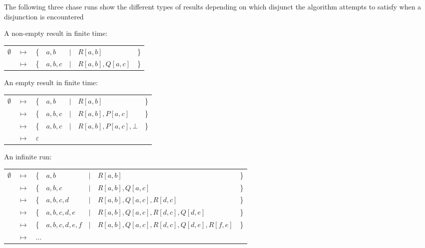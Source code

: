		The following three chase runs show the different types of results
		depending on which disjunct the algorithm attempts to satisfy when a
		disjunction is encountered

		A non-empty result in finite time:

		\begin{tabular}{lllllll}
			$\emptyset$ & $\mapsto$ & \{ & $a,b$   & $|$ & $R[a,b]$         & \} \\
			{}          & $\mapsto$ & \{ & $a,b,c$ & $|$ & $R[a,b], Q[a,c]$ & \} \\
		\end{tabular}

		An empty result in finite time:

		\begin{tabular}{lllllll}
			$\emptyset$ & $\mapsto$ & \{ & $a,b$   & $|$ & $R[a,b]$               & \} \\
			{}          & $\mapsto$ & \{ & $a,b,c$ & $|$ & $R[a,b], P[a,c]$       & \} \\
			{}          & $\mapsto$ & \{ & $a,b,c$ & $|$ & $R[a,b], P[a,c], \bot$ & \} \\
			{}          & $\mapsto$ & \multicolumn{5}{l}{ $\varepsilon$ } \\
		\end{tabular}

		An infinite run:

		\begin{tabular}{lllllll}
			$\emptyset$ & $\mapsto$ & \{ & $a,b$         & $|$ & $R[a,b]$                                 & \} \\
			{}          & $\mapsto$ & \{ & $a,b,c$       & $|$ & $R[a,b], Q[a,c]$                         & \} \\
			{}          & $\mapsto$ & \{ & $a,b,c,d$     & $|$ & $R[a,b], Q[a,c], R[d,c]$                 & \} \\
			{}          & $\mapsto$ & \{ & $a,b,c,d,e$   & $|$ & $R[a,b], Q[a,c], R[d,c], Q[d,e]$         & \} \\
			{}          & $\mapsto$ & \{ & $a,b,c,d,e,f$ & $|$ & $R[a,b], Q[a,c], R[d,c], Q[d,e], R[f,e]$ & \} \\
			{}          & $\mapsto$ & \multicolumn{5}{l}{ $\ldots$ } \\
		\end{tabular}
